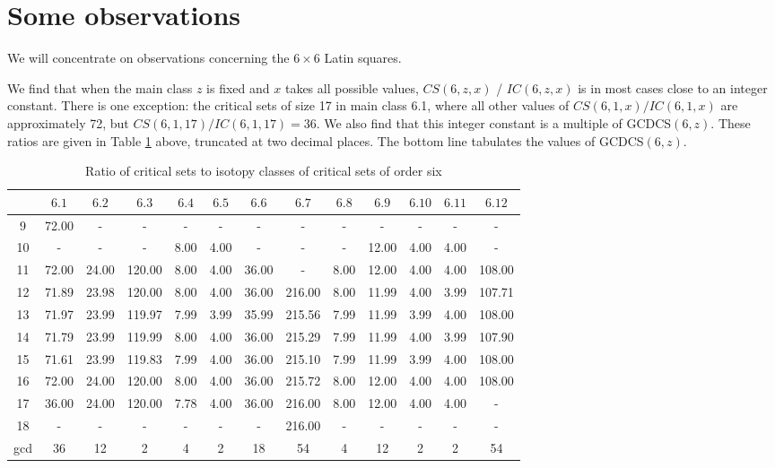 \section{Some observations}

We will concentrate on observations concerning the $6 \times 6$ Latin squares.

We find that when the main class $z$ is fixed and $x$ takes all possible
values, $CS(6,z,x)$ / $IC(6,z,x)$ is in most cases close to an integer
constant.  There is one exception: the critical sets of size 17 in main
class 6.1, where all other values of $CS(6,1,x) / IC(6,1,x)$ are approximately 72,
but $CS(6,1,17) / IC(6,1,17) = 36$.  We also find that this integer constant is a
multiple of GCDCS$(6,z)$.  These ratios are given in Table \ref{seven} above,
truncated at two decimal places.  The bottom line tabulates the values
of GCDCS$(6,z)$.

\begin{table}
\begin{center}
\begin{footnotesize}
\caption{Ratio of critical sets to isotopy classes of critical sets of order six}
\label{seven}
\begin{tabular}{|c|c|c|c|c|c|c|c|c|c|c|c|c|} \hline
& $6.1$ & $6.2$ & $6.3$ & $6.4$ & $6.5$ & $6.6$ & $6.7$ & $6.8$ & $6.9$ & $6.10$ & $6.11$ & $6.12$ \\
\hline
9 &  72.00 &   -   &    -   &  -   &  -   &   -   &    -   &  -   & -     &  -   &  -   &  - \\
10 &   -   &   -   &    -   & 8.00 & 4.00 &   -   &    -   &  -   & 12.00 & 4.00 & 4.00 &  - \\
11 & 72.00 & 24.00 & 120.00 & 8.00 & 4.00 & 36.00 &    -   & 8.00 & 12.00 & 4.00 & 4.00 & 108.00  \\
12 & 71.89 & 23.98 & 120.00 & 8.00 & 4.00 & 36.00 & 216.00 & 8.00 & 11.99 & 4.00 & 3.99 & 107.71 \\
13 & 71.97 & 23.99 & 119.97 & 7.99 & 3.99 & 35.99 & 215.56 & 7.99 & 11.99 & 3.99 & 4.00 & 108.00 \\
14 & 71.79 & 23.99 & 119.99 & 8.00 & 4.00 & 36.00 & 215.29 & 7.99 & 11.99 & 4.00 & 3.99 & 107.90 \\
15 & 71.61 & 23.99 & 119.83 & 7.99 & 4.00 & 36.00 & 215.10 & 7.99 & 11.99 & 3.99 & 4.00 & 108.00 \\
16 & 72.00 & 24.00 & 120.00 & 8.00 & 4.00 & 36.00 & 215.72 & 8.00 & 12.00 & 4.00 & 4.00 & 108.00 \\
17 & 36.00 & 24.00 & 120.00 & 7.78 & 4.00 & 36.00 & 216.00 & 8.00 & 12.00 & 4.00 & 4.00 &    - \\
18 &   -   &   -   &    -   &  -   &  -   &   -   & 216.00 &  -   &   -   &  -   &  -   &    -  \\
\hline
gcd & 36 & 12 & 2 & 4 & 2 & 18 & 54 & 4 & 12 & 2 & 2 & 54  \\
\hline
\end{tabular}\vspace {3mm} \\
\end{footnotesize}
\end{center}
\end{table}

